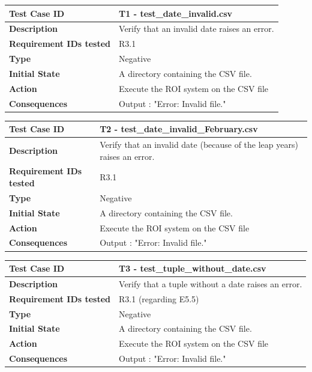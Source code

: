 \documentclass[runningheads,12pt]{article}
\begin{document}
\bigskip
{\centering
\begin{tabular}{|p{1.2in}|p{4in}|}
\hline
\textbf{Test Case ID} & T1 - test\_date\_invalid.csv \\ 
\hline
\textbf{Description} & Verify that an invalid date raises an error.\\
\hline
\textbf{Requirement IDs tested} & R3.1 \\ 
\hline
\textbf{Type} & Negative \\ 
\hline
\textbf{Initial State} & A directory containing the CSV file.\\
\hline 
\textbf{Action} & Execute the ROI system on the CSV file \\
\hline 
\textbf{Consequences} & Output : "Error: Invalid file." \\ 
\hline
\end{tabular}
\bigskip\bigskip
\centering
\begin{tabular}{|p{1.2in}|p{4in}|}
\hline
\textbf{Test Case ID} & T2 - test\_date\_invalid\_February.csv \\ 
\hline
\textbf{Description} & Verify that an invalid date (because of the leap years) raises an error.\\
\hline
\textbf{Requirement IDs tested} & R3.1 \\ 
\hline
\textbf{Type} & Negative \\ 
\hline
\textbf{Initial State} & A directory containing the CSV file.\\
\hline 
\textbf{Action} & Execute the ROI system on the CSV file \\
\hline 
\textbf{Consequences} & Output : "Error: Invalid file." \\ 
\hline
\end{tabular}
\bigskip
\centering
\begin{tabular}{|p{1.2in}|p{4in}|}
\hline
\textbf{Test Case ID} & T3 - test\_tuple\_without\_date.csv \\ 
\hline
\textbf{Description} & Verify that a tuple without a date raises an error.\\
\hline
\textbf{Requirement IDs tested} & R3.1 (regarding E5.5) \\ 
\hline
\textbf{Type} & Negative \\ 
\hline
\textbf{Initial State} & A directory containing the CSV file.\\
\hline 
\textbf{Action} & Execute the ROI system on the CSV file \\
\hline 
\textbf{Consequences} & Output : "Error: Invalid file." \\ 

\end{tabular}}
\end{document}

